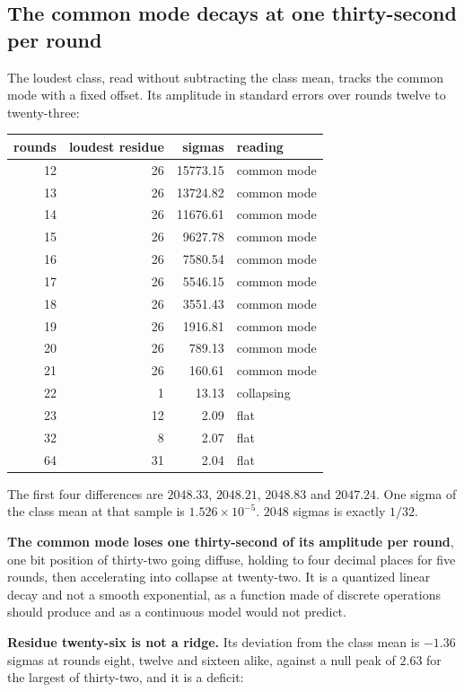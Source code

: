 \subsection{The common mode decays at one thirty-second per round}

The loudest class, read without subtracting the class mean, tracks the common mode with a fixed offset. Its amplitude in standard errors over rounds twelve to twenty-three:

\begin{center}
\begin{tabular}{rrrl}
\toprule
rounds & loudest residue & sigmas & reading \\
\midrule
12 & 26 & 15773.15 & common mode \\
13 & 26 & 13724.82 & common mode \\
14 & 26 & 11676.61 & common mode \\
15 & 26 & 9627.78 & common mode \\
16 & 26 & 7580.54 & common mode \\
17 & 26 & 5546.15 & common mode \\
18 & 26 & 3551.43 & common mode \\
19 & 26 & 1916.81 & common mode \\
20 & 26 & 789.13 & common mode \\
21 & 26 & 160.61 & common mode \\
22 & 1 & 13.13 & collapsing \\
23 & 12 & 2.09 & flat \\
32 & 8 & 2.07 & flat \\
64 & 31 & 2.04 & flat \\
\bottomrule
\end{tabular}
\end{center}

The first four differences are \(2048.33\), \(2048.21\), \(2048.83\) and \(2047.24\). One sigma of the class mean at that sample is \(1.526 \times 10^{-5}\). \(2048\) sigmas is exactly \(1/32\).

\textbf{The common mode loses one thirty-second of its amplitude per round}, one bit position of thirty-two going diffuse, holding to four decimal places for five rounds, then accelerating into collapse at twenty-two. It is a quantized linear decay and not a smooth exponential, as a function made of discrete operations should produce and as a continuous model would not predict.

\textbf{Residue twenty-six is not a ridge.} Its deviation from the class mean is \(-1.36\) sigmas at rounds eight, twelve and sixteen alike, against a null peak of \(2.63\) for the largest of thirty-two, and it is a deficit:

